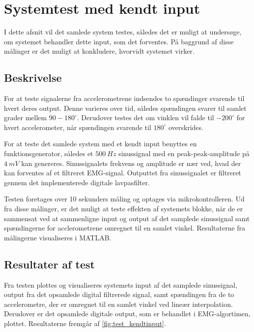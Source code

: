 \section{Systemtest med kendt input}
I dette afsnit vil det samlede system testes, således det er muligt at undersøge, om systemet behandler dette input, som det forventes. På baggrund af disse målinger er det muligt at konkludere, hvorvidt systemet virker. 

\subsection{Beskrivelse}
For at teste signalerne fra accelerometrene indsendes to spændinger svarende til hvert deres output. Denne varieres over tid, således spændingen svarer til samlet grader mellem $90-180^{\circ}$. Derudover testes det om vinklen vil falde til $-200^{\circ}$ for hvert accelerometer, når spændingen svarende til $180^{\circ}$ overskrides. 

For at teste det samlede system med et kendt input benyttes en funktionsgenerator, således et $500~Hz$ sinussignal med en peak-peak-amplitude på $4~mV$ kan genereres. Sinussignalets frekvens og amplitude er nær ved, hvad der kan forventes af et filtreret EMG-signal. Outputtet fra sinussignalet er filtreret gennem det implementerede digitale lavpasfilter. 

Testen foretages over 10 sekunders måling og optages via mikrokontrolleren. Ud fra disse målinger, er det muligt at teste effekten af systemets blokke, når de er sammensat ved at sammenligne input og output af det samplede sinussignal samt spændingerne for acclerometrene omregnet til en samlet vinkel. Resultaterne fra målingerne visualiseres i MATLAB. 


\subsection{Resultater af test}
Fra testen plottes og visualiseres systemets input af det samplede sinussignal, output fra det opsamlede digital filtrerede signal, samt spændingen fra de to accelerometre, der er omregnet til en samlet vinkel ved lineær interpolation. Derudover er det opsamlede digitale output, som er behandlet i EMG-algortimen, plottet. Resultaterne fremgår af \autoref{fig:test_kendtinput}. 

